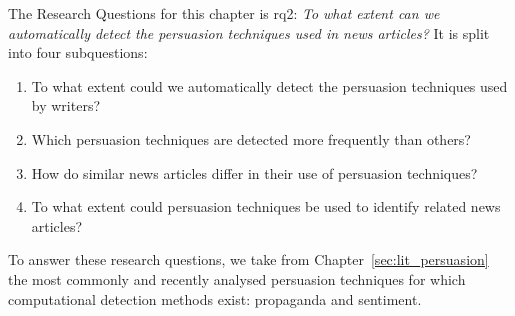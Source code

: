 The Research Questions for this chapter is \acrshort{rq}2: \emph{To what extent can we automatically detect the persuasion techniques used in news articles?} It is split into four subquestions:
\begin{enumerate}[label={\textbf{RQ2.\arabic*:}},leftmargin=2cm]
    \item To what extent could we automatically detect the persuasion techniques used by writers? %
    \item Which persuasion techniques are detected more frequently than others?
    \item How do similar news articles differ in their use of persuasion techniques? %
    \item To what extent could persuasion techniques be used to identify related news articles?%
\end{enumerate}



To answer these research questions, we take from Chapter~\ref{sec:lit_persuasion} the most commonly and recently analysed \gls{persuasion} techniques for which computational detection methods exist: \gls{propaganda} and \gls{sentiment}.

